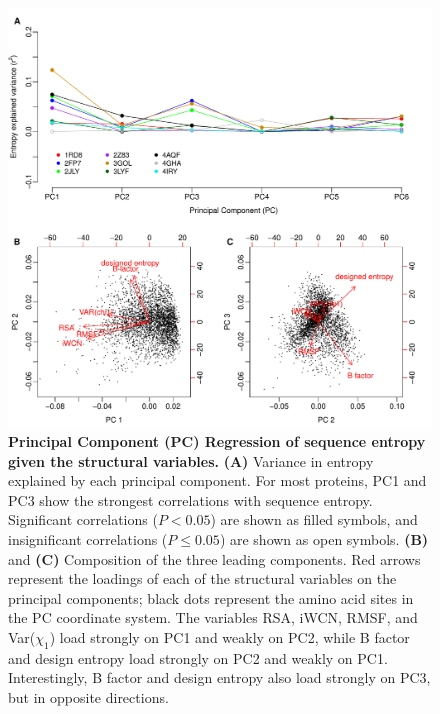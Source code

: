\documentclass[12pt]{article}
\begin{document}
\begin{figure}[tbh]
\begin{center}
       \includegraphics[width=6.5in]{PC_screen_entropy.pdf}
\end{center}
\caption{\textbf{Principal Component (PC) Regression of sequence entropy given the structural variables.} {\bf (A)} Variance in entropy explained by each principal component. For most proteins, PC1 and PC3 show the strongest correlations with sequence entropy. Significant correlations ($P<0.05$) are shown as filled symbols, and insignificant correlations ($P\leq0.05$) are shown as open symbols. {\bf (B)} and {\bf (C)} Composition of the three leading components. Red arrows represent the loadings of each of the structural variables on the principal components; black dots represent the amino acid sites in the PC coordinate system. The variables RSA, iWCN, RMSF, and Var($\chi_1$) load strongly on PC1 and weakly on PC2, while B factor and design entropy load strongly on PC2 and weakly on PC1. Interestingly, B factor and design entropy also load strongly on PC3, but in opposite directions.}
\label{fig:cor_entropy_PC_screen}
\end{figure}
\end{document}
